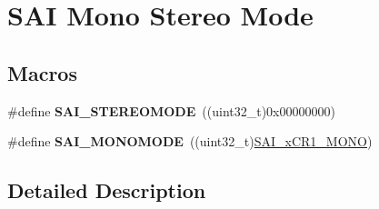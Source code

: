 \hypertarget{group___s_a_i___mono___stereo___mode}{}\section{S\+AI Mono Stereo Mode}
\label{group___s_a_i___mono___stereo___mode}
\subsection*{Macros}
\begin{DoxyCompactItemize}
\item 
\#define {\bfseries S\+A\+I\+\_\+\+S\+T\+E\+R\+E\+O\+M\+O\+DE}~((uint32\+\_\+t)0x00000000)\hypertarget{group___s_a_i___mono___stereo___mode_gaa9889b35f7d830f0d614965ee8f32f2c}{}\label{group___s_a_i___mono___stereo___mode_gaa9889b35f7d830f0d614965ee8f32f2c}

\item 
\#define {\bfseries S\+A\+I\+\_\+\+M\+O\+N\+O\+M\+O\+DE}~((uint32\+\_\+t)\hyperlink{group___peripheral___registers___bits___definition_ga37f2b989e1a54b2c4393cd222e54f4d2}{S\+A\+I\+\_\+x\+C\+R1\+\_\+\+M\+O\+NO})\hypertarget{group___s_a_i___mono___stereo___mode_gaddf14f51dc0b548b0b37fd523b2810e1}{}\label{group___s_a_i___mono___stereo___mode_gaddf14f51dc0b548b0b37fd523b2810e1}

\end{DoxyCompactItemize}


\subsection{Detailed Description}
